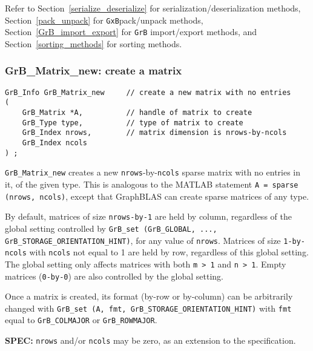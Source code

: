 \documentclass[12pt]{article}
\begin{document}
\vspace{0.2in}
Refer to
Section~\ref{serialize_deserialize} for serialization/deserialization methods,
Section~\ref{pack_unpack} for \verb'GxB'pack/unpack methods,
Section~\ref{GrB_import_export} for \verb'GrB' import/export methods,
and
Section~\ref{sorting_methods} for sorting methods.

\subsubsection{{\sf GrB\_Matrix\_new:}          create a matrix}
\label{matrix_new}

\begin{mdframed}[userdefinedwidth=6in]
{\footnotesize
\begin{verbatim}
GrB_Info GrB_Matrix_new     // create a new matrix with no entries
(
    GrB_Matrix *A,          // handle of matrix to create
    GrB_Type type,          // type of matrix to create
    GrB_Index nrows,        // matrix dimension is nrows-by-ncols
    GrB_Index ncols
) ;
\end{verbatim} } \end{mdframed}

\verb'GrB_Matrix_new' creates a new \verb'nrows'-by-\verb'ncols' sparse matrix
with no entries in it, of the given type.  This is analogous to the MATLAB
statement \verb'A = sparse (nrows, ncols)', except that GraphBLAS can create
sparse matrices of any type.

By default, matrices of size \verb'nrows-by-1' are held by column, regardless
of the global setting controlled by \verb'GrB_set (GrB_GLOBAL, ...,' \newline
\verb'GrB_STORAGE_ORIENTATION_HINT)', for any value of \verb'nrows'.  Matrices
of size \verb'1-by-ncols' with \verb'ncols' not equal to 1 are held by row,
regardless of this global setting.  The global setting only affects matrices
with both \verb'm > 1' and \verb'n > 1'.  Empty matrices (\verb'0-by-0') are
also controlled by the global setting.

Once a matrix is created, its format (by-row or by-column) can be arbitrarily
changed with \verb'GrB_set (A, fmt, GrB_STORAGE_ORIENTATION_HINT)'
with \verb'fmt' equal to \verb'GrB_COLMAJOR' or \verb'GrB_ROWMAJOR'.

\begin{alert}
{\bf SPEC:} \verb'nrows' and/or \verb'ncols' may be zero,
as an extension to the specification.
\end{alert}
\end{document}
